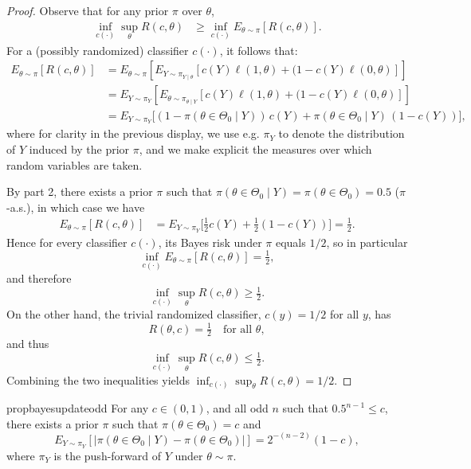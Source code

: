 \documentclass[12pt,reqno]{amsart}
\theoremstyle{theorem}
\theoremstyle{definition}
\newcommand{\0}{\mathbf{0}}
\newcommand{\1}{\mathbf{1}}
\begin{document}
\trivialclassification*
\begin{proof}
Observe that for any prior $\pi$ over $\theta$,
\begin{align*}
 \inf_{c(\cdot)} \sup_{\theta} R(c,\theta)
 &\geq \inf_{c(\cdot)} E_{\theta \sim \pi}[ R(c,\theta)] .
\end{align*}
For a (possibly randomized) classifier $c(\cdot)$, it follows that:
\begin{align*}
E_{\theta \sim \pi}[R(c,\theta)] & = E_{\theta \sim \pi}[ E_{Y \sim \pi_{Y \mid \theta}}[c(Y)\ell(1,\theta) + (1-c(Y) \ell(0,\theta)] ] \\
&= E_{Y \sim \pi_Y}[ E_{\theta \sim \pi_{\theta \mid Y}}[c(Y)\ell(1,\theta) + (1-c(Y) \ell(0,\theta)] ] \\
&= E_{Y \sim \pi_Y}\Big[
(1-\pi(\theta \in \Theta_0\mid Y))\,c(Y) + \pi(\theta \in \Theta_0\mid Y)\,(1-c(Y))
\Big],
\end{align*}
where for clarity in the previous display, we use e.g. $\pi_Y$ to denote the distribution of $Y$ induced by the prior $\pi$, and we make explicit the measures over which random variables are taken. 

By  part 2, there exists a prior $\pi$ such that
$\pi(\theta \in \Theta_0 \mid Y) = \pi(\theta \in \Theta_0) = 0.5$ ($\pi$-a.s.), in which case we have
\begin{align*}
E_{\theta\sim\pi}[R(c,\theta)]
&= E_{Y \sim \pi_Y}\Big[ \tfrac12 c(Y) + \tfrac12 (1-c(Y))\Big]
= \tfrac12 .
\end{align*}
Hence for every classifier $c(\cdot)$, its Bayes risk under $\pi$ equals $1/2$, so in particular
\[
\inf_{c(\cdot)} E_{\theta\sim\pi}[R(c,\theta)] = \tfrac12,
\]
and therefore
\[
\inf_{c(\cdot)} \sup_{\theta} R(c,\theta) \ge \tfrac12.
\]
On the other hand, the trivial randomized classifier, $c(y)= 1/2$ for all $y$, has
\[
R(\theta,c)=\tfrac12 \quad \text{for all }\theta,
\]
and thus
\[
\inf_{c(\cdot)} \sup_{\theta} R(c,\theta) \le \tfrac12.
\]
Combining the two inequalities yields $\inf_{c(\cdot)} \sup_{\theta} R(c,\theta) = 1/2$.
\end{proof}



\begin{restatable}{prop}{bayesupdateodd}
\label{prop:bayesupdateodd}
For any $c \in (0,1)$, and all odd $n$ such that $0.5^{n-1} \leq c$, there exists a prior $\pi$ such that $\pi(\theta \in
\Theta_0) = c$ and
\[ E_{Y \sim \pi_Y}\left[ \left| \pi(\theta \in \Theta_0 \mid Y) - \pi(\theta \in \Theta_0)   \right| \right] = 2^{-(n-2)} (1-c) , \]
where $\pi_Y$ is the push-forward of $Y$ under $\theta \sim \pi$.
\end{restatable}
\end{document}
